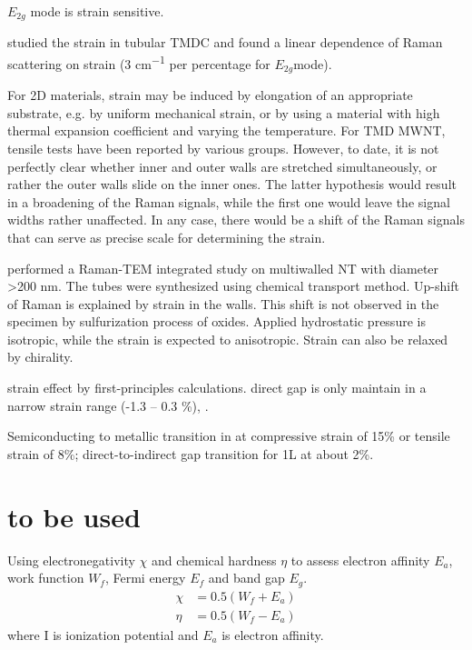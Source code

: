 $E_{2g}$ mode is strain sensitive. 

\citeauthor{Ghorbani-Asl2013} studied the strain in tubular TMDC and found a linear dependence of Raman scattering on strain (3 \si{cm^{-1}} per percentage for $E_{2g}$mode).\cite{Ghorbani-Asl2013} 

For 2D materials, strain may be induced by elongation of an appropriate substrate, e.g. by uniform mechanical strain, or by using a material with high thermal expansion coefficient and varying the temperature. For TMD MWNT, tensile tests have been reported by various groups. However, to date, it is not perfectly clear whether inner and outer walls are stretched simultaneously, or rather the outer walls slide on the inner ones. The latter hypothesis would result in a broadening of the Raman signals, while the first one would leave the signal widths rather unaffected. In any case, there would be a shift of the Raman signals that can serve as precise scale for determining the strain.\cite{Ghorbani-Asl2013}


\citeauthor{Virsek2007} performed a Raman-TEM integrated study on multiwalled  NT with diameter \textgreater 200 nm. The tubes were synthesized using chemical transport method. Up-shift of Raman is explained by strain in the walls. This shift is not observed in the specimen by sulfurization process of oxides. Applied hydrostatic pressure is isotropic,\cite{Staiger2012} while the strain is expected to anisotropic. Strain can also be relaxed by chirality.\cite{Virsek2007} 

strain effect by first-principles calculations. direct gap is only maintain in a narrow strain range (-1.3 -- 0.3 \%), \cite{Yun2012}.

Semiconducting to metallic transition in  at compressive strain of 15\% or tensile strain of 8\%; direct-to-indirect gap transition for 1L  at about 2\%. \cite{Scalise2012}



\chapter{to be used}

\cite{Matar2011} Using electronegativity $\chi$ and chemical hardness $\eta$ to assess electron affinity $E_a$, work function $W_f$, Fermi energy $E_f$ and band gap $E_g$.
\begin{align}
\chi &= 0.5(W_f + E_a)\\
\eta & = 0.5(W_f - E_a)
\end{align}
where I is ionization potential and $E_a$ is electron affinity.


